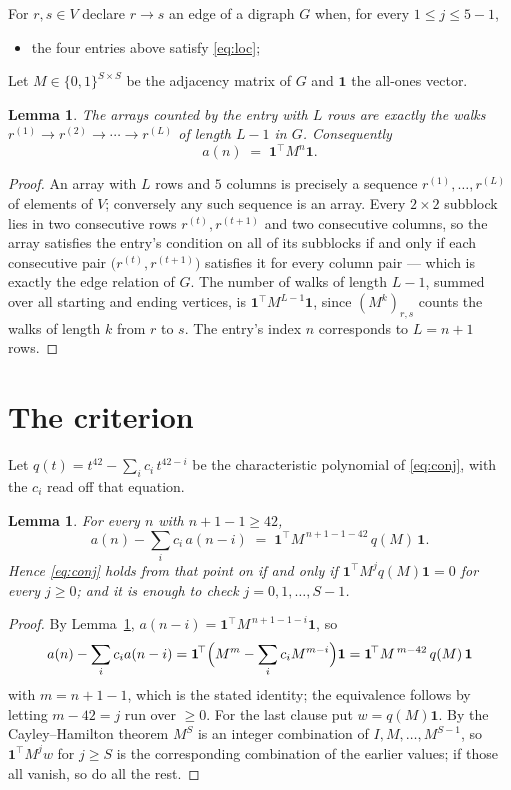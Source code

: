 \documentclass[11pt,a4paper]{article}
\theoremstyle{plain}
\newtheorem{lemma}[theorem]{Lemma}
\theoremstyle{definition}
\begin{document}
For $r,s\in V$ declare $r\to s$ an edge of a digraph $G$ when, for every
$1\le j\le 5-1$,
\begin{itemize}
\item the four entries above satisfy \eqref{eq:loc};

\end{itemize}
Let $M\in\{0,1\}^{S\times S}$ be the adjacency matrix of $G$ and $\mathbf{1}$ the
all-ones vector.

\begin{lemma}\label{lem:walk}
The arrays counted by the entry with $L$ rows are exactly the walks
$r^{(1)}\to r^{(2)}\to\cdots\to r^{(L)}$ of length $L-1$ in $G$. Consequently
\[
a(n)\;=\;\mathbf{1}^{\!\top}M^{n}\mathbf{1} .
\]
\end{lemma}

\begin{proof}
An array with $L$ rows and $5$ columns is precisely a sequence
$r^{(1)},\dots,r^{(L)}$ of elements of $V$; conversely any such sequence is an array.
Every $2\times2$ subblock lies in two consecutive rows $r^{(t)},r^{(t+1)}$ and two
consecutive columns, so the array satisfies the entry's condition on all of its subblocks
if and only if each consecutive pair $\bigl(r^{(t)},r^{(t+1)}\bigr)$ satisfies it for
every column pair --- which is exactly the edge relation of $G$. The number of walks of
length $L-1$, summed over all starting and ending vertices, is
$\mathbf{1}^{\!\top}M^{L-1}\mathbf{1}$, since $(M^{k})_{r,s}$ counts the walks of
length $k$ from $r$ to $s$. The entry's index $n$ corresponds to $L=n+1$ rows.
\end{proof}

\section{The criterion}

Let $q(t)=t^{42}-\sum_i c_i\,t^{42-i}$ be the characteristic polynomial of
\eqref{eq:conj}, with the $c_i$ read off that equation.

\begin{lemma}\label{lem:crit}
For every $n$ with $n+1-1\ge42$,
\[
a(n)-\sum_i c_i\,a(n-i)\;=\;\mathbf{1}^{\!\top}M^{\,n+1-1-42}\,q(M)\,\mathbf{1} .
\]
Hence \eqref{eq:conj} holds from that point on if and only if
$\mathbf{1}^{\!\top}M^{j}q(M)\mathbf{1}=0$ for every $j\ge0$; and it is enough to check
$j=0,1,\dots,S-1$.
\end{lemma}

\begin{proof}
By Lemma~\ref{lem:walk}, $a(n-i)=\mathbf{1}^{\!\top}M^{\,n+1-1-i}\mathbf{1}$, so
\[
a(n)-\sum_i c_i a(n-i)
=\mathbf{1}^{\!\top}\Bigl(M^{m}-\sum_i c_i M^{m-i}\Bigr)\mathbf{1}
=\mathbf{1}^{\!\top}M^{\,m-42}\,q(M)\,\mathbf{1}
\]
with $m=n+1-1$, which is the stated identity; the equivalence follows by letting
$m-42=j$ run over $\ge0$. For the last clause put $w=q(M)\mathbf{1}$. By the
Cayley--Hamilton theorem $M^{S}$ is an integer combination of $I,M,\dots,M^{S-1}$, so
$\mathbf{1}^{\!\top}M^{j}w$ for $j\ge S$ is the corresponding combination of the earlier
values; if those all vanish, so do all the rest.
\end{proof}
\end{document}
